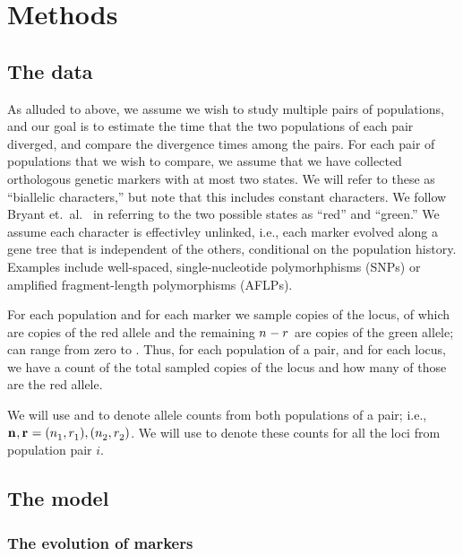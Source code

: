 \section{Methods}

\subsection{The data}
As alluded to above, we assume we wish to study multiple pairs of populations,
and our goal is to estimate the time that the two populations of each pair
diverged, and compare the divergence times among the pairs.
For each pair of populations that we wish to compare, we assume that we have
collected orthologous genetic markers with at most two states.
We will refer to these as ``biallelic characters,'' but note that this includes
constant characters.
We follow Bryant et.\ al.\ \citeyear{Bryant2012} in referring to the two
possible states as ``red'' and ``green.''
We assume each character is effectivley unlinked, i.e., each marker evolved
along a gene tree that is independent of the others, conditional on the
population history.
Examples include well-spaced, single-nucleotide polymorhphisms (SNPs) or
amplified fragment-length polymorphisms (AFLPs).

For each population and for each marker we sample \allelecount
copies of the locus, \redallelecount of which are copies of the red
allele and the remaining $\allelecount - \redallelecount$ are
copies of the green allele;
\redallelecount can range from zero to \allelecount.
Thus, for each population of a pair, and for each locus, we have a count of the
total sampled copies of the locus and how many of those are the red allele.

We will use \leafallelecounts and \leafredallelecounts to denote allele counts
from both populations of a pair; i.e., 
$\leafallelecounts, \leafredallelecounts = (\allelecount[1], \redallelecount[1]), 
(\allelecount[2], \redallelecount[2])$.
We will use \comparisondata[i] to denote these counts for all the loci from
population pair $i$.


\subsection{The model}

\subsubsection{The evolution of markers}

